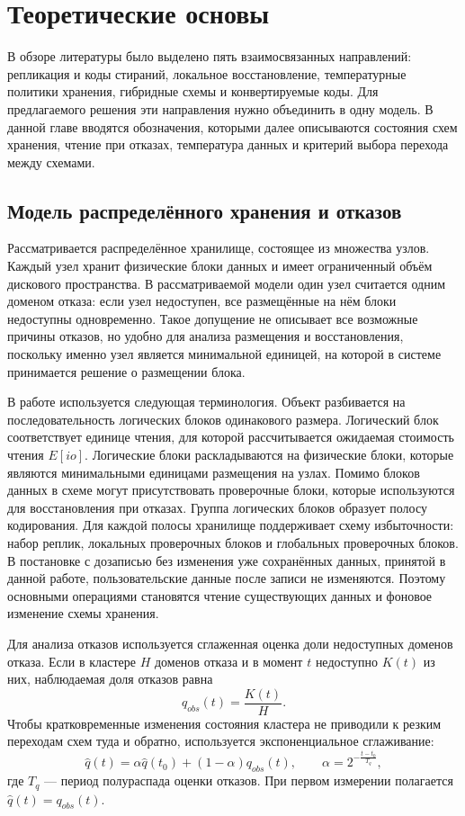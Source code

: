 \section{Теоретические основы}
\label{sec:theory}

В обзоре литературы было выделено пять взаимосвязанных направлений:
репликация и коды стираний, локальное восстановление, температурные политики
хранения, гибридные схемы и конвертируемые коды. Для предлагаемого решения эти
направления нужно объединить в одну модель. В данной главе вводятся
обозначения, которыми далее описываются состояния схем хранения, чтение при
отказах, температура данных и критерий выбора перехода между схемами.

\subsection{Модель распределённого хранения и отказов}

Рассматривается распределённое хранилище, состоящее из множества узлов. Каждый
узел хранит физические блоки данных и имеет ограниченный объём дискового
пространства. В рассматриваемой модели один узел считается одним доменом отказа: если
узел недоступен, все размещённые на нём блоки недоступны одновременно.
Такое допущение не описывает все возможные причины отказов, но удобно для
анализа размещения и восстановления, поскольку именно узел является минимальной
единицей, на которой в системе принимается решение о размещении блока.

В работе используется следующая терминология. Объект разбивается на
последовательность логических блоков одинакового размера. Логический блок
соответствует единице чтения, для которой рассчитывается ожидаемая стоимость
чтения \(E[io]\). Логические блоки раскладываются на физические блоки, которые
являются минимальными единицами размещения на узлах. Помимо блоков данных в
схеме могут присутствовать проверочные блоки, которые используются для
восстановления при отказах. Группа логических блоков образует полосу
кодирования. Для каждой
полосы хранилище поддерживает схему избыточности: набор реплик,
локальных проверочных блоков и глобальных проверочных блоков. В
постановке с дозаписью без изменения уже сохранённых данных, принятой в данной
работе, пользовательские данные после записи не изменяются. Поэтому основными
операциями становятся чтение существующих данных и фоновое изменение схемы
хранения.

Для анализа отказов используется сглаженная оценка доли недоступных доменов
отказа. Если в кластере \(H\) доменов отказа и в момент \(t\) недоступно
\(K(t)\) из них, наблюдаемая доля отказов равна
\[
    q_{obs}(t)=\frac{K(t)}{H}.
\]
Чтобы кратковременные изменения состояния кластера не приводили к резким
переходам схем туда и обратно, используется экспоненциальное сглаживание:
\[
    \hat q(t)=
    \alpha \hat q(t_0) + (1-\alpha)q_{obs}(t),
    \qquad
    \alpha = 2^{-\frac{t-t_0}{T_q}},
\]
где \(T_q\) --- период полураспада оценки отказов. При первом измерении
полагается \(\hat q(t)=q_{obs}(t)\).

